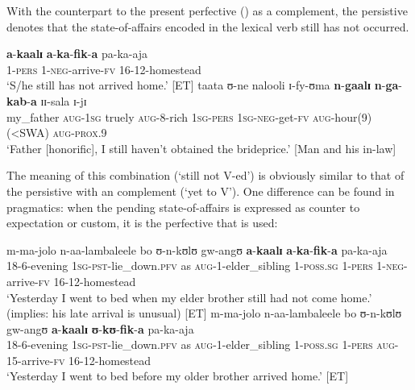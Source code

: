 With the  counterpart to the present perfective () as a complement, the persistive denotes that the state-of-affairs encoded in the lexical verb still has not occurred. 

\begin{exe}
\ex \gll \textbf{a}-\textbf{kaalɪ} \textbf{a}-\textbf{ka}-\textbf{fik}-\textbf{a} pa-ka-aja\\
1-\textsc{pers} 1-\textsc{neg}-arrive-\textsc{fv} 16-12-homestead\\
\glt `S/he still has not arrived home.' [ET]
\ex \gll taata ʊ-ne nalooli ɪ-fy-ʊma \textbf{n}-\textbf{gaalɪ} \textbf{n}-\textbf{ga}-\textbf{kab}-\textbf{a} ɪɪ-sala ɪ-jɪ\\
my\_father \textsc{aug}-\textsc{1sg} truely \textsc{aug}-8-rich \textsc{1sg}-\textsc{pers} \textsc{1sg}-\textsc{neg}-get-\textsc{fv} \textsc{aug}-hour(9)(<SWA) \textsc{aug}-\textsc{prox.9}\\
\glt `Father [honorific], I still haven't obtained the brideprice.' [Man and his in-law] 
\end{exe}

The meaning of this combination (\lq still not V-ed') is obviously similar to that of the persistive with an  complement (\lq yet to V'). One difference can be found in pragmatics: when the pending state-of-affairs is expressed as counter to expectation or custom, it is the  perfective that is used:
\begin{exe}
\ex \begin{xlist}
\ex \gll m-ma-jolo n-aa-lambaleele bo ʊ-n-kʊlʊ gw-angʊ \textbf{a}-\textbf{kaalɪ} \textbf{a}-\textbf{ka}-\textbf{fik}-\textbf{a} pa-ka-aja\\
18-6-evening \textsc{1sg}-\textsc{pst}-lie\_down.\textsc{pfv} as \textsc{aug}-1-elder\_sibling 1-\textsc{poss.sg} 1-\textsc{pers} 1-\textsc{neg}-arrive-\textsc{fv} 16-12-homestead\\
\glt `Yesterday I went to bed when my elder brother still had not come home.' (implies: his late arrival is unusual) [ET]
\ex \gll m-ma-jolo n-aa-lambaleele bo ʊ-n-kʊlʊ gw-angʊ \textbf{a}-\textbf{kaalɪ} \textbf{ʊ}-\textbf{kʊ}-\textbf{fik}-\textbf{a} pa-ka-aja\\
18-6-evening \textsc{1sg}-\textsc{pst}-lie\_down.\textsc{pfv} as \textsc{aug}-1-elder\_sibling 1-\textsc{poss.sg} 1-\textsc{pers} \textsc{aug}-15-arrive-\textsc{fv} 16-12-homestead\\
\glt `Yesterday I went to bed before my older brother arrived home.' [ET]
\end{xlist}
\end{exe}


